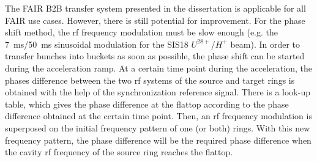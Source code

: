 The FAIR B2B transfer system presented in the dissertation is applicable for all FAIR use cases. However, there is still potential for improvement. For the phase shift method, the rf frequency modulation must be slow enough (e.g. the \SI{7}{\ms}/\SI{50}{\ms} sinusoidal modulation for the SIS18 $U^\mathit{28+}$/$H^\mathit{+}$ beam). In order to transfer bunches into buckets as soon as possible, the phase shift can be started during the acceleration ramp. At a certain time point during the acceleration, the phases difference between the two rf systems of the source and target rings is obtained with the help of the synchronization reference signal. There is a look-up table, which gives the phase difference at the flattop according to the phase difference obtained at the certain time point. Then, an rf frequency modulation is superposed on the initial frequency pattern of one (or both) rings. With this new frequency pattern, the phase difference will be the required phase difference when the cavity rf frequency of the source ring reaches the flattop. 

